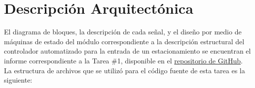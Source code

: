 \section{Descripción Arquitectónica}
\hspace{1.27cm} El diagrama de bloques, la descripción de cada señal, y el diseño por medio de máquinas de estado del módulo  correspondiente a la descripción estructural del controlador automatizado para la entrada de un estacionamiento se encuentran el informe correspondiente a la Tarea \#1, disponible en el \hyperref[git]{repositorio de GitHub}. La estructura de archivos que se utilizó para el código fuente de esta tarea es la siguiente:


